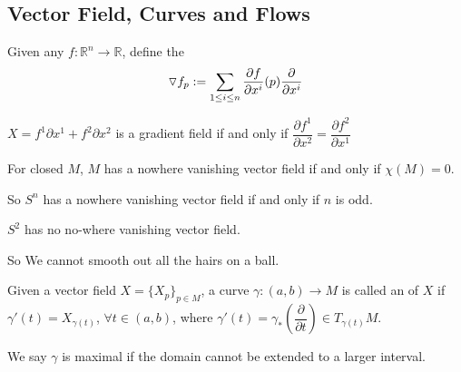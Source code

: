 \subsection{Vector Field, Curves and Flows}
Given any  $ f:\mathbb{R}^n\rightarrow \mathbb{R} $, define the  
\[\displaystyle\triangledown f_p:=\sum\limits_{1 \leq i \leq n}\frac{\partial f}{\partial x^i}(p)\frac{\partial}{\partial x^i}\] 
\begin{example}
    $ X=f^1\partial x^1+f^2\partial x^2 $ is a gradient field if and only if  $ \dfrac{\partial f^1}{\partial x^2}=\dfrac{\partial f^2}{\partial x^1} $ 
\end{example}
\begin{theorem}
   For closed  $ M  $,  $ M  $ has a nowhere vanishing vector field if and only if  $ \chi(M)=0 $. 
\end{theorem}
So  $ S^n $ has a  nowhere vanishing vector field if and only if  $ n  $ is odd.
\begin{theorem}[MaoQiu]
    $ S^2 $ has no no-where vanishing vector field.
    
   
\end{theorem}
So We cannot smooth out all the hairs on a ball.

   Given  a vector field  $ X=\{X_p\}_{p\in M} $, a curve  $ \gamma:(a,b)\rightarrow M $ is called an  of  $ X $ if  $ \gamma'(t)=X_{\gamma(t)} $, $ \forall t\in (a,b) $, 
   where  $ \gamma'(t)=\gamma_*(\dfrac{\partial }{\partial t})\in T_{\gamma(t)}M $.
   
   We say  $ \gamma  $ is maximal if the domain cannot be extended to a larger interval.     